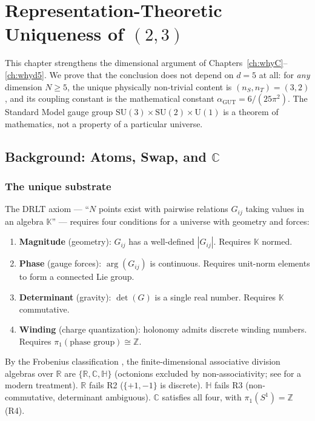 \documentclass[12pt]{article}
\theoremstyle{remark}
\theoremstyle{definition}
\newcommand{\CC}{\mathbb{C}}
\newcommand{\RR}{\mathbb{R}}
\newcommand{\agut}{\alpha_{\mathrm{GUT}}}
\begin{document}
\section{Representation-Theoretic Uniqueness of $(2,3)$}
\label{ch:rep_uniqueness}

This chapter strengthens the dimensional argument of Chapters~\ref{ch:whyC}--\ref{ch:whyd5}. We prove that the conclusion does not depend on $d = 5$ at all: for \emph{any} dimension $N \geq 5$, the unique physically non-trivial content is $(n_S, n_T) = (3, 2)$, and its coupling constant is the mathematical constant $\agut = 6/(25\pi^2)$. The Standard Model gauge group $\mathrm{SU}(3)\times\mathrm{SU}(2)\times\mathrm{U}(1)$ is a theorem of mathematics, not a property of a particular universe.

\subsection{Background: Atoms, Swap, and $\CC$}

\subsubsection{The unique substrate}

The DRLT axiom --- ``$N$ points exist with pairwise relations $G_{ij}$ taking values in an algebra $\mathbb{K}$'' --- requires four conditions for a universe with geometry and forces:

\begin{enumerate}
\item[\textbf{R1.}] \textbf{Magnitude} (geometry): $G_{ij}$ has a well-defined $|G_{ij}|$. Requires $\mathbb{K}$ normed.
\item[\textbf{R2.}] \textbf{Phase} (gauge forces): $\arg(G_{ij})$ is continuous. Requires unit-norm elements to form a connected Lie group.
\item[\textbf{R3.}] \textbf{Determinant} (gravity): $\det(G)$ is a single real number. Requires $\mathbb{K}$ commutative.
\item[\textbf{R4.}] \textbf{Winding} (charge quantization): holonomy admits discrete winding numbers. Requires $\pi_1(\text{phase group}) \cong \mathbb{Z}$.
\end{enumerate}

By the Frobenius classification \cite{Frobenius, Hurwitz}, the
finite-dimensional associative division algebras over $\RR$ are
$\{\RR, \CC, \mathbb{H}\}$ (octonions excluded by
non-associativity; see \cite{Baez} for a modern treatment). $\RR$ fails R2 ($\{+1,-1\}$ is discrete). $\mathbb{H}$ fails R3 (non-commutative, determinant ambiguous). $\CC$ satisfies all four, with $\pi_1(S^1) = \mathbb{Z}$ (R4).
\end{document}
